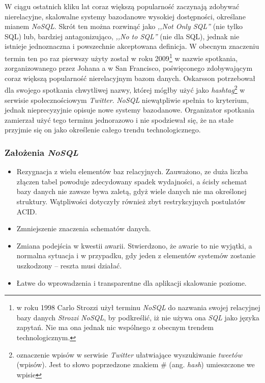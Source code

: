 W ciągu ostatnich kliku lat coraz większą popularność zaczynają zdobywać nierelacyjne, skalowalne systemy bazodanowe wysokiej dostępności, określane mianem \emph{NoSQL}. Skrót ten można rozwinąć jako \emph{,,Not Only SQL''} (nie tylko SQL) lub, bardziej antagonizująco, \emph{,,No to SQL''} (nie dla SQL), jednak nie istnieje jednoznaczna i powszechnie akceptowana definicja. W obecnym znaczeniu termin ten po raz pierwszy użyty został w roku 2009\footnote{w roku 1998 Carlo Strozzi użył terminu \emph{NoSQL} do nazwania swojej relacyjnej bazy danych \emph{Strozzi NoSQL}, by podkreślić, iż nie używa ona \emph{SQL} jako języka zapytań. Nie ma ona jednak nic wspólnego z obecnym trendem technologicznym.} w nazwie spotkania, zorganizowanego przez Johana a w San Francisco, poświęconego zdobywającym coraz większą popularność nierelacyjnym bazom danych. Oskarsson potrzebował dla swojego spotkania chwytliwej nazwy, której mógłby użyć jako \emph{hashtag}\footnote{oznaczenie wpisów w serwisie \emph{Twitter} ułatwiające wyszukiwanie \emph{tweetów} (wpisów). Jest to słowo poprzedzone znakiem \# (ang. \emph{hash}) umieszczone we wpisie} w serwisie społecznościowym \emph{Twitter}. \emph{NoSQL} niewątpliwie spełnia to kryterium, jednak nieprecyzyjnie opisuje nowe systemy bazodanowe. Organizator spotkania zamierzał użyć tego terminu jednorazowo i nie spodziewał się, że na stałe przyjmie się on jako określenie całego trendu technologicznego.

\subsubsection{Założenia \emph{NoSQL}}
\label{sec:zalozeniaNoSQL}
\begin{itemize}
\item Rezygnacja z wielu elementów baz relacyjnych. Zauważono, ze duża liczba złączen tabel powoduje zdecydowany spadek wydajności, a ścisły schemat bazy danych nie zawsze bywa zaletą, gdyż wiele danych nie ma określonej struktury. Wątpliwości dotyczyły również zbyt restrykcyjnych postulatów ACID.
\item Zmniejszenie znaczenia schematów danych.
\item Zmiana podejścia w kwestii awarii. Stwierdzono, że awarie to nie wyjątki, a normalna sytuacja i w przypadku, gdy jeden z elementów systemów zostanie uszkodzony – reszta musi działać.
\item Łatwe do wprowadzenia i transparentne dla aplikacji skalowanie poziome.
\end{itemize}

